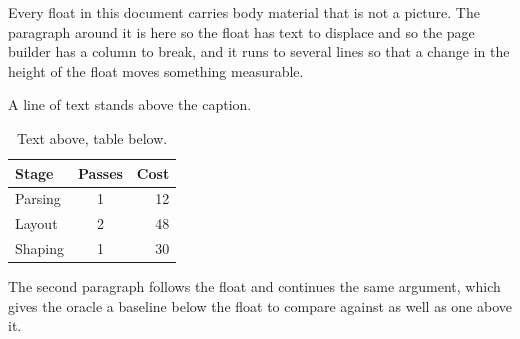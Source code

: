 \documentclass{article}
\begin{document}
Every float in this document carries body material that is not a
picture. The paragraph around it is here so the float has text to displace and
so the page builder has a column to break, and it runs to several lines so that
a change in the height of the float moves something measurable.

\begin{table}[h]
\centering
A line of text stands above the caption.

\caption{Text above, table below.}
\begin{tabular}{|l|c|r|}
\hline
Stage & Passes & Cost \\
\hline
Parsing & 1 & 12 \\
Layout & 2 & 48 \\
Shaping & 1 & 30 \\
\hline
\end{tabular}
\end{table}

The second paragraph follows the float and continues the same
argument, which gives the oracle a baseline below the float to compare against
as well as one above it.
\end{document}
